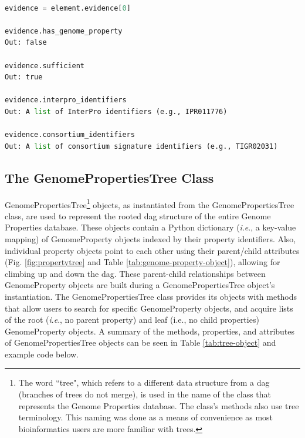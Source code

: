 \begin{lstlisting}[language=Python]

evidence = element.evidence[0]
	
evidence.has_genome_property
Out: false

evidence.sufficient
Out: true

evidence.interpro_identifiers
Out: A list of InterPro identifiers (e.g., IPR011776)

evidence.consortium_identifiers 
Out: A list of consortium signature identifiers (e.g., TIGR02031)

\end{lstlisting}

\subsection{The GenomePropertiesTree Class} \label{GenomePropertiesTree-Class}

GenomePropertiesTree\footnote{The word ``tree", which refers to a different data 
structure from a \gls{dag} (branches of trees do not merge), is used in the name 
of the class that represents the Genome Properties database. The class's methods 
also use tree terminology. This naming was done as a means of convenience as 
most bioinformatics users are more familiar with trees.}  objects, as 
instantiated from the GenomePropertiesTree class, are used to represent the 
rooted \gls{dag} structure of the entire Genome Properties database.  These 
objects contain a Python dictionary (\textit{i}.\textit{e}., a key-value mapping) of 
GenomeProperty objects indexed by their property identifiers. Also, individual 
property objects point to each other using their parent/child attributes (Fig. 
\ref{fig:propertytree} and Table \ref{tab:genome-property-object}), allowing for 
climbing up and down the \gls{dag}. These parent-child relationships between 
GenomeProperty objects are built during a GenomePropertiesTree object's 
instantiation. The GenomePropertiesTree class provides its objects with methods 
that allow users to search for specific GenomeProperty objects, and acquire 
lists of the root (\textit{i}.\textit{e}., no parent property) and leaf (i.e., no child 
properties) GenomeProperty objects. A summary of the methods, properties, and 
attributes of GenomePropertiesTree objects can be seen in Table 
\ref{tab:tree-object} and example code below.

